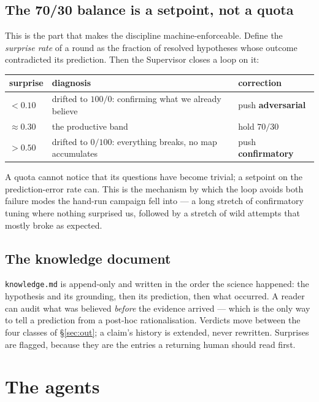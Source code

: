 \documentclass[11pt]{article}
\newcommand{\code}[1]{\texttt{#1}}
\begin{document}
\subsection{The 70/30 balance is a setpoint, not a quota}

This is the part that makes the discipline machine-enforceable. Define the \emph{surprise rate}
of a round as the fraction of resolved hypotheses whose outcome contradicted its prediction. Then
the Supervisor closes a loop on it:

\begin{center}\small
\begin{tabular}{@{}lll@{}}
\toprule
\textbf{surprise} & \textbf{diagnosis} & \textbf{correction} \\
\midrule
$< 0.10$ & drifted to $100/0$: confirming what we already believe & push \textbf{adversarial} \\
$\approx 0.30$ & the productive band & hold $70/30$ \\
$> 0.50$ & drifted to $0/100$: everything breaks, no map accumulates & push \textbf{confirmatory} \\
\bottomrule
\end{tabular}
\end{center}

A quota cannot notice that its questions have become trivial; a setpoint on the prediction-error
rate can. This is the mechanism by which the loop avoids both failure modes the hand-run campaign
fell into --- a long stretch of confirmatory tuning where nothing surprised us, followed by a
stretch of wild attempts that mostly broke as expected.

\subsection{The knowledge document}

\code{knowledge.md} is append-only and written in the order the science happened: the hypothesis
and its grounding, then its prediction, then what occurred. A reader can audit what was believed
\emph{before} the evidence arrived --- which is the only way to tell a prediction from a
post-hoc rationalisation. Verdicts move between the four classes of \S\ref{sec:out}; a claim's
history is extended, never rewritten. Surprises are flagged, because they are the entries a
returning human should read first.

\section{The agents}
\label{sec:agents}
\end{document}
